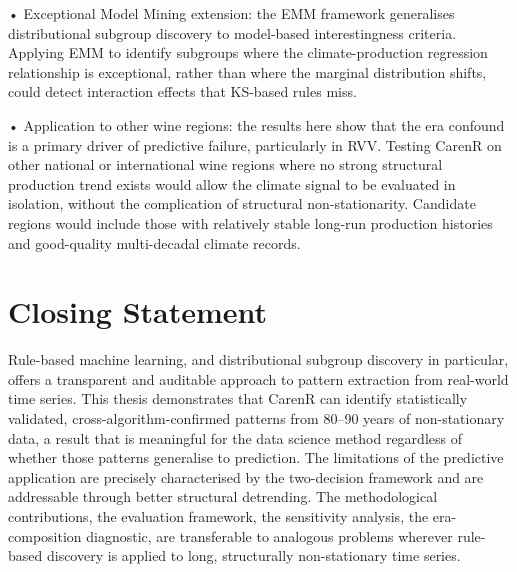 \noindent •  Exceptional Model Mining extension: the EMM framework \citep{Duivesteijn2016} generalises distributional subgroup discovery to model-based interestingness criteria. Applying EMM to identify subgroups where the climate-production regression relationship is exceptional, rather than where the marginal distribution shifts, could detect interaction effects that KS-based rules miss.

\noindent •  Application to other wine regions: the results here show that the era confound is a primary driver of predictive failure, particularly in RVV. Testing CarenR on other national or international wine regions where no strong structural production trend exists would allow the climate signal to be evaluated in isolation, without the complication of structural non-stationarity. Candidate regions would include those with relatively stable long-run production histories and good-quality multi-decadal climate records.


\section{Closing Statement}\label{sec:closing_statement}

Rule-based machine learning, and distributional subgroup discovery in particular, offers a transparent and auditable approach to pattern extraction from real-world time series. This thesis demonstrates that CarenR can identify statistically validated, cross-algorithm-confirmed patterns from 80--90 years of non-stationary data, a result that is meaningful for the data science method regardless of whether those patterns generalise to prediction. The limitations of the predictive application are precisely characterised by the two-decision framework and are addressable through better structural detrending. The methodological contributions, the evaluation framework, the sensitivity analysis, the era-composition diagnostic, are transferable to analogous problems wherever rule-based discovery is applied to long, structurally non-stationary time series.

